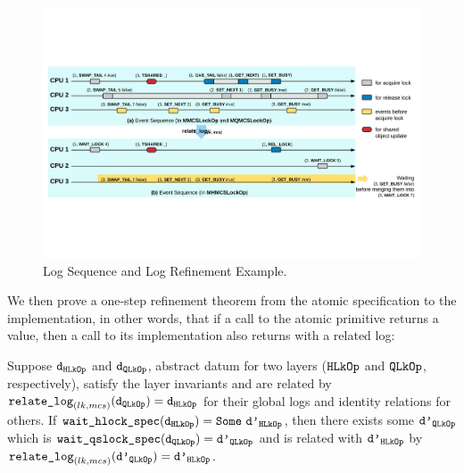 \begin{figure}
\includegraphics[width=\textwidth]{figs/mcslock/logsequence}
\caption{Log Sequence and Log Refinement Example.}
\label{fig:chapter:mcslock:logsequence}
\end{figure}

We then prove a one-step refinement theorem from the atomic specification 
to the implementation, in other words, that if a call to the atomic primitive returns a 
value, then a call to its implementation also returns with a related log:

\begin{theorem}
  \label{thm:chapter:mcslock:mcs_wait_lock_exist}

  Suppose ${\mathrm{\texttt{d}}}_{{\mathrm{\texttt{HLkOp}}}}$ and ${\mathrm{\texttt{d}}}_{{\mathrm{\texttt{QLkOp}}}}$, abstract datum for two layers (${\mathrm{\texttt{HLkOp}}}$ and ${\mathrm{\texttt{QLkOp}}}$, respectively),
   satisfy the layer
  invariants and are related by
   ${\mathrm{\texttt{relate\_log}}}_{(lk, mcs)}({{\mathrm{\texttt{d}}}_{{\mathrm{\texttt{QLkOp}}}}}) = {{\mathrm{\texttt{d}}}_{{\mathrm{\texttt{HLkOp}}}}}$ for their global logs and identity relations for others.
If ${\mathrm{\texttt{wait\_hlock\_spec}}}({\mathrm{\texttt{d}}}_{{\mathrm{\texttt{HLkOp}}}}) = {\mathrm{\texttt{Some}}}\ {\mathrm{\texttt{d'}}}_{{\mathrm{\texttt{HLkOp}}}}$, then there exists some 
${\mathrm{\texttt{d'}}}_{{\mathrm{\texttt{QLkOp}}}}$
  which is ${\mathrm{\texttt{wait\_qslock\_spec}}}({\mathrm{\texttt{d}}}_{{\mathrm{\texttt{QLkOp}}}}) = {\mathrm{\texttt{d'}}}_{{\mathrm{\texttt{QLkOp}}}}$ and is related with ${\mathrm{\texttt{d'}}}_{{\mathrm{\texttt{HLkOp}}}}$  by
   ${\mathrm{\texttt{relate\_log}}}_{(lk, mcs)}({{\mathrm{\texttt{d'}}}_{{\mathrm{\texttt{QLkOp}}}}}) = {{\mathrm{\texttt{d'}}}_{{\mathrm{\texttt{HLkOp}}}}}$.
\end{theorem}


